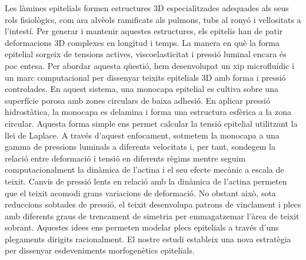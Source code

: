 \begin{Abstractcat}
	
	Les làmines epitelials formen estructures 3D especialitzades adequades als seus rols fisiològics, com ara alvèols ramificats als pulmons, tubs al ronyó i vellositats a l'intestí. Per generar i mantenir aquestes estructures, els epitelis han de patir deformacions 3D complexes en longitud i temps. La manera en què la forma epitelial sorgeix de tensions actives, viscoelasticitat i pressió luminal encara és poc entesa. Per abordar aquesta qüestió, hem desenvolupat un xip microfluídic i un marc computacional per dissenyar teixits epitelials 3D amb forma i pressió controlades. En aquest sistema, una monocapa epitelial es cultiva sobre una superfície porosa amb zones circulars de baixa adhesió. En aplicar pressió hidrostàtica, la monocapa es delamina i forma una estructura esfèrica a la zona circular. Aquesta forma simple ens permet calcular la tensió epitelial utilitzant la llei de Laplace. A través d'aquest enfocament, sotmetem la monocapa a una gamma de pressions luminals a diferents velocitats i, per tant, sondegem la relació entre deformació i tensió en diferents règims mentre seguim computacionalment la dinàmica de l'actina i el seu efecte mecànic a escala de teixit. Canvis de pressió lents en relació amb la dinàmica de l'actina permeten que el teixit acomodi grans variacions de deformació. No obstant això, sota reduccions sobtades de pressió, el teixit desenvolupa patrons de vinclament i plecs amb diferents graus de trencament de simetria per emmagatzemar l'àrea de teixit sobrant. Aquestes idees ens permeten modelar plecs epitelials a través d'uns plegaments dirigits racionalment. El nostre estudi estableix una nova estratègia per dissenyar esdeveniments morfogenètics epitelials.
	
\end{Abstractcat}

\cleardoublepage